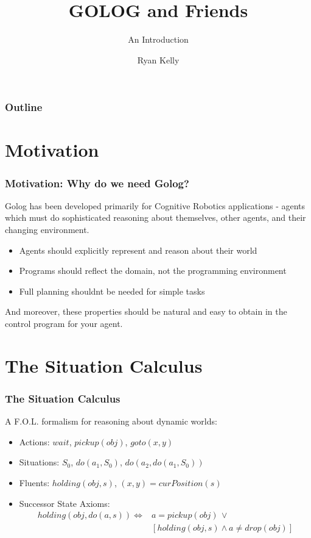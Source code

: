 \documentclass{beamer}
\title{GOLOG and Friends}
\subtitle{An Introduction}
\author{Ryan Kelly}
\begin{document}
\begin{frame}
  \titlepage
\end{frame}

\begin{frame}
  \frametitle{Outline}
  \tableofcontents
\end{frame}

\section{Motivation}

\begin{frame}
\frametitle{Motivation: Why do we need Golog?}
Golog has been developed primarily for Cognitive Robotics applications - agents
which must do sophisticated reasoning about themselves, other agents, and their
changing environment.
\begin{itemize}
\item Agents should explicitly represent and reason about their world
\item Programs should reflect the domain, not the programming environment
\item Full planning shouldnt be needed for simple tasks
\end{itemize}
And moreover, these properties should be natural and easy to obtain in the
control program for your agent.
\end{frame}


\section{The Situation Calculus}

\begin{frame}
\frametitle{The Situation Calculus}

A F.O.L. formalism for reasoning about dynamic worlds:

\begin{itemize}
\pause
\item Actions: $wait$, $pickup(obj)$, $goto(x,y)$
\pause
\item Situations: $S_{0}$, $do(a_{1},S_{0})$, $do(a_{2},do(a_{1},S_{0}))$
\pause
\item Fluents: $holding(obj,s)$, $(x,y)=curPosition(s)$
\pause
\item Successor State Axioms:\[
\begin{array}{cc}
holding(obj,do(a,s))\iff & a=pickup(obj)\,\vee\\
 & \left[holding(obj,s)\wedge a\neq drop(obj)\right]\end{array}\]
\end{itemize}

\end{frame}
\end{document}
